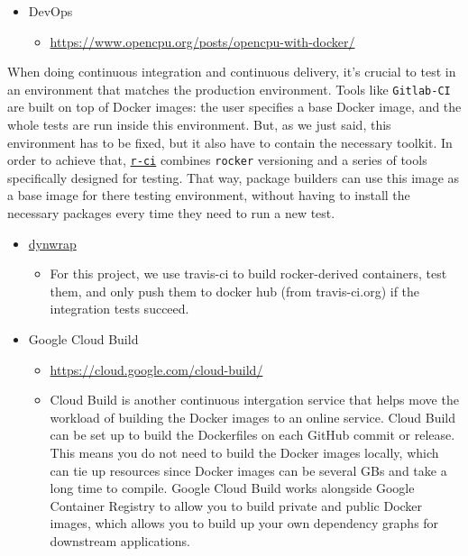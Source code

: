 \begin{itemize}
\tightlist
\item
  DevOps

  \begin{itemize}
  \tightlist
  \item
    \url{https://www.opencpu.org/posts/opencpu-with-docker/}
  \end{itemize}
\end{itemize}

When doing continuous integration and continuous delivery, it's crucial
to test in an environment that matches the production environment. Tools
like \texttt{Gitlab-CI} are built on top of Docker images: the user
specifies a base Docker image, and the whole tests are run inside this
environment. But, as we just said, this environment has to be fixed, but
it also have to contain the necessary toolkit. In order to achieve that,
\href{https://github.com/ColinFay/r-ci}{\texttt{r-ci}} combines
\texttt{rocker} versioning and a series of tools specifically designed
for testing. That way, package builders can use this image as a base
image for there testing environment, without having to install the
necessary packages every time they need to run a new test.

\begin{itemize}
\tightlist
\item
  \href{https://github.com/dynverse/dynwrap_containers/blob/master/.travis.yml}{dynwrap}
  \citep{rcannood}

  \begin{itemize}
  \tightlist
  \item
    For this project, we use travis-ci to build rocker-derived
    containers, test them, and only push them to docker hub (from
    travis-ci.org) if the integration tests succeed.
  \end{itemize}
\item
  Google Cloud Build

  \begin{itemize}
  \tightlist
  \item
    \url{https://cloud.google.com/cloud-build/}
  \item
    Cloud Build is another continuous intergation service that helps
    move the workload of building the Docker images to an online
    service. Cloud Build can be set up to build the Dockerfiles on each
    GitHub commit or release. This means you do not need to build the
    Docker images locally, which can tie up resources since Docker
    images can be several GBs and take a long time to compile. Google
    Cloud Build works alongside Google Container Registry to allow you
    to build private and public Docker images, which allows you to build
    up your own dependency graphs for downstream applications.
  \end{itemize}
\end{itemize}

